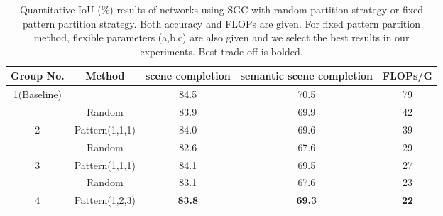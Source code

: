 \documentclass[runningheads]{llncs}
\begin{document}
\begin{table}[t]
\centering
\caption{Quantitative IoU (\%) results of networks using SGC with random partition strategy or fixed pattern partition strategy. Both accuracy and FLOPs are given. For fixed pattern partition method, flexible parameters (a,b,c) are also given and we select the best results in our experiments. Best trade-off is bolded.}
\label{tab:group-results}
\resizebox{\textwidth}{!}
{\begin{tabular}{c|c|c|c|l|cl}
\hline
{Group No.} & {Method} & {scene completion} & \multicolumn{2}{c|}{{semantic scene completion}} & \multicolumn{2}{c}{{FLOPs/G}} \\ \hline
1(Baseline)                      &                               & 84.5                                        & \multicolumn{2}{c|}{70.5}                                                 & \multicolumn{2}{c}{79}                             \\ \hline
                                 & Random                        & 83.9                                        & \multicolumn{2}{c|}{69.9}                                                 & \multicolumn{2}{c}{42}                             \\
\multirow{-2}{*}{2}              & Pattern(1,1,1)                & 84.0                                        & \multicolumn{2}{c|}{69.6}                                                 & \multicolumn{2}{c}{39}                             \\ \hline
                                 & Random                        & 82.6                                        & \multicolumn{2}{c|}{67.6}                                                 & \multicolumn{2}{c}{29}                             \\
\multirow{-2}{*}{3}              & Pattern(1,1,1)                & 84.1                                        & \multicolumn{2}{c|}{69.5}                                                 & \multicolumn{2}{c}{27}                             \\ \hline
                                 & Random                        & 83.1                                        & \multicolumn{2}{c|}{67.6}                                                 & \multicolumn{2}{c}{23}                             \\
\multirow{-2}{*}{4}              & Pattern(1,2,3)                & \textbf{83.8}                                        & \multicolumn{2}{c|}{\textbf{69.3}}                                                 & \multicolumn{2}{c}{\textbf{22}}                             \\ \hline

\end{tabular}}
\end{table}
\end{document}
